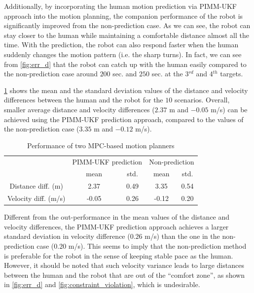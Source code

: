 \documentclass[journal]{IEEEtran}
\begin{document}
	Additionally, by incorporating the human motion prediction via PIMM-UKF approach into the motion planning, the companion performance of the robot is significantly improved from the non-prediction case. As we can see, the robot can stay closer to the human while maintaining a comfortable distance almost all the time.
    With the prediction, the robot can also respond faster when the human suddenly changes the motion pattern (i.e. the sharp turns). In fact, we can see from \cref{fig:err_d} that the robot can catch up with the human easily compared to the non-prediction case around $200$ sec. and $250$ sec. at the 3$^{rd}$ and 4$^{th}$ targets.
    
    \cref{table:MPC_RMS_error} shows the mean and the standard deviation values of the distance and velocity differences between the human and the robot for the $10$ scenarios. 
    Overall, smaller average distance and velocity differences ($2.37$ m and $-0.05$ m/s) can be achieved using the PIMM-UKF prediction approach, compared to the values of the non-prediction case ($3.35$ m and $-0.12$ m/s). 
\begin{table}[tbp]
\centering
\caption{Performance of two MPC-based motion planners} %
\label{table:MPC_RMS_error}
\begin{tabular}{|c|c|c|c|c|}
\hline
\multirow{2}{*}{} & \multicolumn{2}{c|}{PIMM-UKF prediction} & \multicolumn{2}{c|}{Non-prediction}\\ \cline{2-5}& ~~mean~~ &std.& ~mean~& std. \\ \hline
\multicolumn{1}{|c|}{Distance diff. (m)}& 2.37& 0.49& 3.35& 0.54\\ \hline
\multicolumn{1}{|c|}{Velocity diff. (m/s)} & -0.05& 0.26& -0.12& 0.20\\ \hline
\end{tabular}
\end{table}
Different from the out-performance in the mean values of the distance and velocity differences, the PIMM-UKF prediction approach achieves a larger standard deviation in velocity difference ($0.26$ m/s) than the one in the non-prediction case ($0.20$ m/s).
	This seems to imply that the non-prediction method is preferable for the robot in the sense of keeping stable pace as the human.
	However, it should be noted that such velocity variance leads to large distances between the human and the robot that are out of the ``comfort zone'', as shown in \cref{fig:err_d} and \cref{fig:constraint_violation}, which is undesirable.
\end{document}
